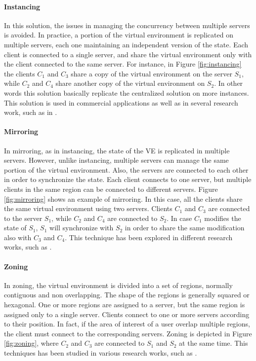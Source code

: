 \documentclass[final,10pt,a5paper]{phdimt}
\theoremstyle{definition}
\begin{document}
\paragraph{Instancing}
In this solution, the issues in managing the concurrency between multiple servers is avoided.
In practice, a portion of the virtual environment is replicated on multiple servers, each one maintaining an independent version of the state.
Each client is connected to a single server, and share the virtual environment only with the client connected to the same server.
For instance, in Figure \ref{fig:instancing} the clients $C_1$ and $C_3$ share a copy of the virtual environment on the server $S_1$, while $C_2$ and $C_4$ share another copy of the virtual environment on $S_2$.
In other words this solution basically replicate the centralized solution on more instances.
This solution is used in commercial applications as well as in several research work, such as in \cite{Barri2011}.

\paragraph{Mirroring}
In mirroring, as in instancing, the state of the VE is replicated in multiple servers.
However, unlike instancing, multiple servers can manage the same portion of the virtual environment.
Also, the servers are connected to each other in order to synchronize the state.
Each client connects to one server, but multiple clients in the same region can be connected to different servers.
Figure \ref{fig:mirroring}  shows an example of mirroring. 
In this case, all the clients share the same virtual environment using two servers.
Clients $C_1$ and $C_3$ are connected to the server $S_1$, while $C_2$ and $C_4$ are connected to $S_2$.
In case $C_1$ modifies the state of $S_1$, $S_1$ will synchronize with $S_2$ in order to share the same modification also with $C_3$ and $C_4$. This technique has been explored in different research works, such as \cite{cronin2004efficient,mauve2002generic}. 

\paragraph{Zoning}
In zoning, the virtual environment is divided into a set of regions, normally contiguous and non overlapping.
The shape of the regions is generally squared or hexagonal. 
One or more regions are assigned to a server, but the same region is assigned only to a single server.
Clients connect to one or more servers according to their position. In fact, if the area of interest of a user overlap multiple regions, the client must connect to the corresponding servers.
Zoning is depicted in Figure \ref{fig:zoning}, where $C_2$ and $C_3$ are connected to $S_1$ and $S_2$ at the same time.
This techniques has been studied in various research works, such as \cite{carlini2010integration,Kim2004,greenhalgh1995massive,lee2002atlas}.\\
\end{document}
